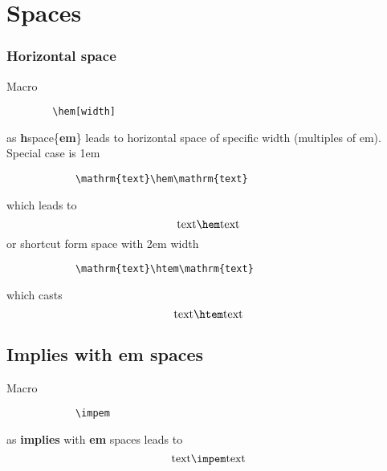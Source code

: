 \documentclass{article}
\begin{document}
	\section*{Spaces}
		\subsubsection*{Horizontal space}
		Macro
		\begin{lstlisting}
		\hem[width]
		\end{lstlisting}
		as \textbf{h}space\{\textbf{em}\} leads to horizontal space of specific width (multiples of em). Special case is 1em
		\begin{lstlisting}
			\mathrm{text}\hem\mathrm{text}
		\end{lstlisting}
		which leads to
		\begin{equation*}
			\mathrm{text}\hem\mathrm{text}
		\end{equation*}
		or shortcut form space with 2em width
		\begin{lstlisting}
			\mathrm{text}\htem\mathrm{text}
		\end{lstlisting}
		which casts
		\begin{equation*}
			\mathrm{text}\htem\mathrm{text}
		\end{equation*}
	
		\subsection*{Implies with em spaces}
		Macro
		\begin{lstlisting}
			\impem
		\end{lstlisting}
		as \textbf{implies} with \textbf{em} spaces leads to
		\begin{equation*}
			\mathrm{text}\impem\mathrm{text}
		\end{equation*}
\end{document}
